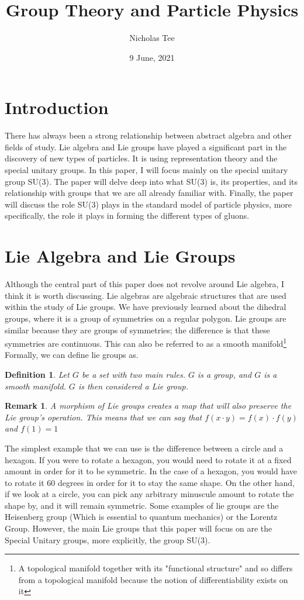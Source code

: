 \documentclass[12pt]{article}
\newtheorem{definition}{Definition}
\newtheorem*{rem}{Remark}
\begin{document}

\title{Group Theory and Particle Physics}
\date{9 June, 2021}
\author{Nicholas Tee}

\maketitle
\newpage
\section{Introduction}
There has always been a strong relationship between abstract algebra and other fields of study. Lie algebra and Lie groups have played a significant part in the discovery of new types of particles. It is using representation theory and the special unitary groups. In this paper, I will focus mainly on the special unitary group SU(3). The paper will delve deep into what SU(3) is, its properties, and its relationship with groups that we are all already familiar with. Finally, the paper will discuss the role SU(3) plays in the standard model of particle physics, more specifically, the role it plays in forming the different types of gluons.
\section{Lie Algebra and Lie Groups}
Although the central part of this paper does not revolve around Lie algebra, I think it is worth discussing. Lie algebras are algebraic structures that are used within the study of Lie groups. We have previously learned about the dihedral groups, where it is a group of symmetries on a regular polygon. Lie groups are similar because they are groups of symmetries; the difference is that these symmetries are continuous. This can also be referred to as a smooth manifold\footnote{A topological manifold together with its "functional structure" and so differs from a topological manifold because the notion of differentiability exists on it} Formally, we can define lie groups as. \\
\begin{definition}
Let $G$ be a set with two main rules. $G$ is a group, and $G$ is a smooth manifold. $G$ is then considered a Lie group.
\end{definition}	
\begin{rem}
A morphism of Lie groups creates a map that will also preserve the Lie group's operation. This means that we can say that $f(x \cdot y) = f(x) \cdot f(y)$ and $f(1) = 1$
\end{rem}
The simplest example that we can use is the difference between a circle and a hexagon. If you were to rotate a hexagon, you would need to rotate it at a fixed amount in order for it to be symmetric. In the case of a hexagon, you would have to rotate it 60 degrees in order for it to stay the same shape. On the other hand, if we look at a circle, you can pick any arbitrary minuscule amount to rotate the shape by, and it will remain symmetric. Some examples of lie groups are the Heisenberg group (Which is essential to quantum mechanics) or the Lorentz Group. However, the main Lie groups that this paper will focus on are the Special Unitary groups, more explicitly, the group SU(3).
\newpage
\end{document}
